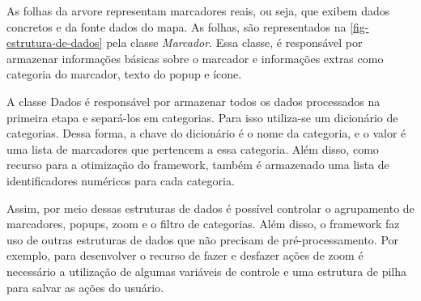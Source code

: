 	As folhas da arvore representam marcadores reais, ou seja, que exibem dados concretos e da fonte dados do mapa. As folhas, são representados na \autoref{fig-estrutura-de-dados} pela classe \textit{Marcador}. Essa classe, é responsável por armazenar informações básicas sobre o marcador e informações extras como categoria do marcador, texto do popup e ícone.  
	
	A classe Dados é responsável por armazenar todos os dados processados na primeira etapa e separá-los em categorias. Para isso utiliza-se um dicionário de categorias. Dessa forma, a chave do dicionário é o nome da categoria, e o valor é uma lista de marcadores que pertencem a essa categoria. Além disso, como recurso para a otimização do framework, também é armazenado uma lista de identificadores numéricos para cada categoria.

	Assim, por meio dessas estruturas de dados é possível controlar o agrupamento de marcadores, popups, zoom  e o filtro de categorias. Além disso, o framework faz uso de outras estruturas de dados que não precisam de pré-processamento. Por exemplo, para desenvolver o recurso de fazer e desfazer ações de zoom é necessário a utilização de algumas variáveis de controle e uma estrutura de pilha para salvar as ações do usuário.  
	
	 
	 
		 
		

